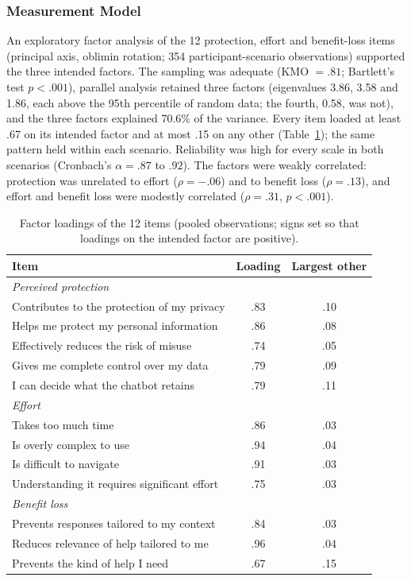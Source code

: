 \documentclass[conference,compsoc]{IEEEtran}
\begin{document}
\subsubsection{Measurement Model}

An exploratory factor analysis of the 12 protection, effort and benefit-loss items (principal axis, oblimin rotation; 354 participant-scenario observations) supported the three intended factors. The sampling was adequate (KMO $=.81$; Bartlett's test $p<.001$), parallel analysis retained three factors (eigenvalues 3.86, 3.58 and 1.86, each above the 95th percentile of random data; the fourth, 0.58, was not), and the three factors explained 70.6\% of the variance. Every item loaded at least .67 on its intended factor and at most .15 on any other (Table~\ref{tab:efa}); the same pattern held within each scenario. Reliability was high for every scale in both scenarios (Cronbach's $\alpha=.87$ to $.92$). The factors were weakly correlated: protection was unrelated to effort ($\rho=-.06$) and to benefit loss ($\rho=.13$), and effort and benefit loss were modestly correlated ($\rho=.31$, $p<.001$).

\begin{table}[t]
\centering
\caption{Factor loadings of the 12 items (pooled observations; signs set so that loadings on the intended factor are positive).}
\label{tab:efa}
\small
\setlength{\tabcolsep}{3pt}
\begin{tabular}{p{}cc}
\toprule
Item & Loading & Largest other \\
\midrule
\multicolumn{3}{l}{\textit{Perceived protection}} \\
Contributes to the protection of my privacy & .83 & .10 \\
Helps me protect my personal information & .86 & .08 \\
Effectively reduces the risk of misuse & .74 & .05 \\
Gives me complete control over my data & .79 & .09 \\
I can decide what the chatbot retains & .79 & .11 \\
\midrule
\multicolumn{3}{l}{\textit{Effort}} \\
Takes too much time & .86 & .03 \\
Is overly complex to use & .94 & .04 \\
Is difficult to navigate & .91 & .03 \\
Understanding it requires significant effort & .75 & .03 \\
\midrule
\multicolumn{3}{l}{\textit{Benefit loss}} \\
Prevents responses tailored to my context & .84 & .03 \\
Reduces relevance of help tailored to me & .96 & .04 \\
Prevents the kind of help I need & .67 & .15 \\
\bottomrule
\end{tabular}
\end{table}
\end{document}
